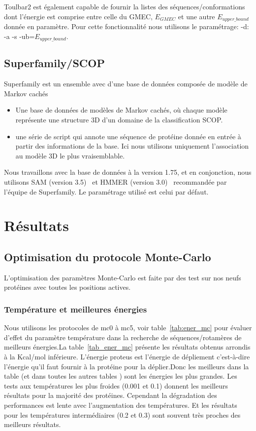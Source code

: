 Toulbar2 est également capable de fournir la listes des séquences/conformations dont l'énergie est comprise entre celle du GMEC, $E_{GMEC}$ et une autre $E_{upper\_bound}$ donnée en paramètre. Pour cette fonctionnalité nous utilisons le paramétrage:  -d: -a -s -ub=$E_{upper\_bound}$.


   \subsection{Superfamily/SCOP} 

Superfamily est un ensemble avec d'une base de données composée de modèle de Markov cachés~\citep{refSuperfamily}

\begin{itemize}
\item Une base de données de modèles de Markov cachés, où chaque modèle représente une structure 3D d'un domaine de la classification SCOP.
\item une série de script qui annote une séquence de protéine donnée en entrée à partir des informations de la base. Ici nous utilisons uniquement l'association au modèle 3D le plus vraisemblable. 
\end{itemize}

Nous travaillons avec la base de données à la version 1.75, et en conjonction, nous utilisons SAM (version 3.5)~\citep{refSam} et HMMER (version 3.0)~\citep{refHmmer} recommandée par l'équipe de Superfamily. Le paramétrage utilisé est celui par défaut.


    
    \clearpage
    \section{Résultats} 

    \subsection{Optimisation du protocole Monte-Carlo}

L'optimisation des paramètres Monte-Carlo est faite par des test sur nos neufs protéines avec toutes les positions actives.


   \subsubsection{Température et meilleures énergies} 
Nous utilisons les protocoles de mc0 à mc5, voir table~\ref{tab:ener_mc} pour évaluer d'effet du paramètre température dans la recherche de séquences/rotamères de meilleurs énergies.La table~\ref{tab_ener_mc} présente les résultats obtenus arrondis à la Kcal/mol inférieure. L'énergie proteus est l'énergie de dépliement c'est-à-dire l'énergie qu'il faut fournir à la protéine pour la déplier.Donc les meilleurs dans la table (et dans toutes les autres tables ) sont les énergies les plus grandes. Les tests aux températures les plus froides (0.001 et 0.1) donnent les meilleurs résultats  pour la majorité des protéines. Cependant la dégradation des performances est lente avec l'augmentation des températures. Et les résultats pour les températures intermédiaires (0.2 et 0.3) sont souvent très proches des meilleurs résultats.    

